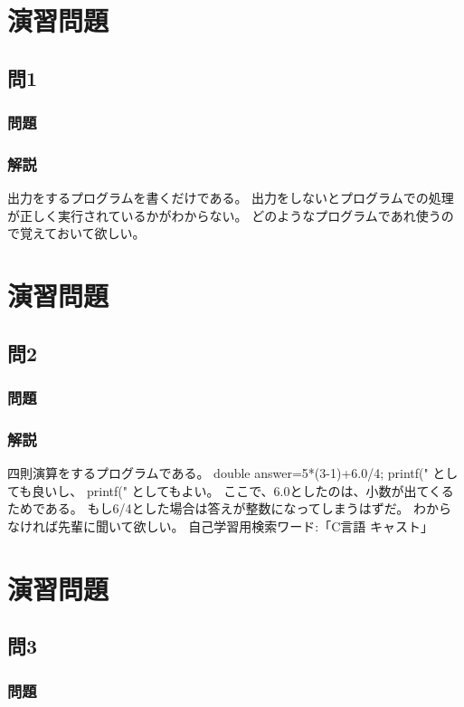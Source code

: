 \section{演習問題}
\subsection{問1}
\subsubsection{問題}

\subsubsection{解説}
出力をするプログラムを書くだけである。
出力をしないとプログラムでの処理が正しく実行されているかがわからない。
どのようなプログラムであれ使うので覚えておいて欲しい。

\section{演習問題}
\subsection{問2}
\subsubsection{問題}

\subsubsection{解説}

四則演算をするプログラムである。
double answer=5*(3-1)+6.0/4;
printf("%
としても良いし、
printf("%
としてもよい。
ここで、6.0としたのは、小数が出てくるためである。
もし6/4とした場合は答えが整数になってしまうはずだ。
わからなければ先輩に聞いて欲しい。
自己学習用検索ワード:「C言語 キャスト」

\section{演習問題}
\subsection{問3}
\subsubsection{問題}

